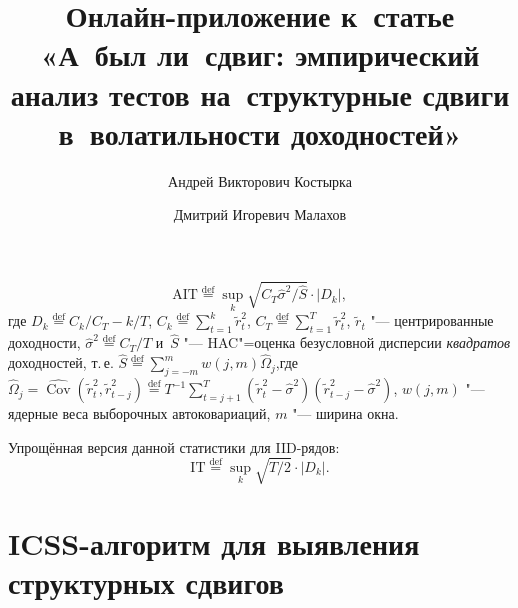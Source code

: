 \documentclass[11pt]{article}
\title{Онлайн-приложение к~статье \\ «А~был ли~сдвиг: эмпирический анализ тестов на~структурные сдвиги в~волатильности доходностей»}
\author{Андрей Викторович Костырка \and Дмитрий Игоревич Малахов}
\DeclareMathOperator*{\Cov}{Cov}
\newcommand{\eqdef}{\mathrel{\stackrel{\text{def}}=}} %
\begin{document}
\maketitle

\begin{equation}\label{eq:ait}
	\mathrm{AIT} \eqdef \sup_k \sqrt{C_T \hat\sigma^2 / \hat S} \cdot \left| D_k \right|,
\end{equation}
где $D_k \eqdef C_k / C_T - k / T$, $C_k \eqdef \sum_{t=1}^k \tilde r_t^2$, $C_T \eqdef \sum_{t=1}^T \tilde r_t^2$, $\tilde r_t$ "--- центрированные доходности, $\hat\sigma^2 \eqdef C_T / T$ и~$\hat S$ "--- HAC"=оценка безусловной дисперсии \textit{квадратов} доходностей, т.\,е. $\hat S \eqdef \sum_{j = -m}^m w(j, m) \hat \Omega_j$,где  $\hat\Omega_j = \widehat{\Cov}(\tilde r^2_t, \tilde r^2_{t-j}) \eqdef T^{-1} \sum_{t=j+1}^T (\tilde r^2_t - \hat\sigma^2) (\tilde r^2_{t-j} - \hat\sigma^2)$, $w(j, m)$ "--- ядерные веса выборочных автоковариаций, $m$ "--- ширина окна.

Упрощённая версия данной статистики для IID-рядов:
\begin{equation}
\mathrm{IT} \eqdef \sup_k \sqrt{T/2} \cdot \left|D_k \right|.
\end{equation}


\section{ICSS-алгоритм для выявления структурных сдвигов}
\end{document}
